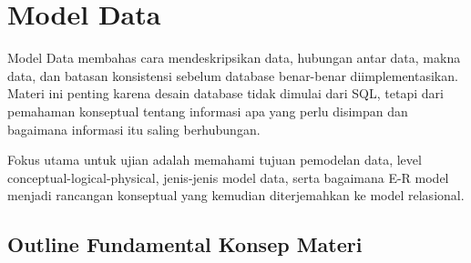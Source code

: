\section{Model Data}

Model Data membahas cara mendeskripsikan data, hubungan antar data, makna data, dan batasan konsistensi sebelum database benar-benar diimplementasikan. Materi ini penting karena desain database tidak dimulai dari SQL, tetapi dari pemahaman konseptual tentang informasi apa yang perlu disimpan dan bagaimana informasi itu saling berhubungan.

Fokus utama untuk ujian adalah memahami tujuan pemodelan data, level conceptual-logical-physical, jenis-jenis model data, serta bagaimana E-R model menjadi rancangan konseptual yang kemudian diterjemahkan ke model relasional.

\subsection{Outline Fundamental Konsep Materi}

